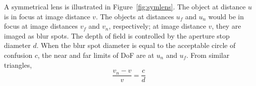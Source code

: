 \documentclass[11pt, oneside]{scrartcl}   	%
\begin{document}
A symmetrical lens is illustrated in Figure~\ref{fig:symlens}. The object at distance $u$ is in focus at image distance $v$. The objects at distances $u_f$ and $u_n$ would be in focus at image distances $v_f$ and $v_n$, respectively; at image distance $v$, they are imaged as blur spots. The depth of field is controlled by the aperture stop diameter $d$. When the blur spot diameter is equal to the acceptable circle of confusion $c$, the near and far limits of DoF are at $u_n$ and $u_f$. From similar triangles,
\begin{equation}
  \frac{v_n-v}{v} = \frac c d
  \label{eq:1}
\end{equation}

\end{document}
